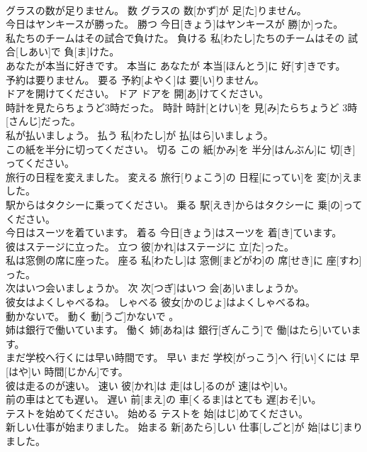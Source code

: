 \documentclass[8pt]{extreport}
\begin{document}
\begin{CJK}{UTF8}{min}
\\	グラスの数が足りません。	数	グラスの 数[かず]が 足[た]りません。	
\\	今日はヤンキースが勝った。	勝つ	今日[きょう]はヤンキースが 勝[か]った。	
\\	私たちのチームはその試合で負けた。	負ける	私[わたし]たちのチームはその 試合[しあい]で 負[ま]けた。	
\\	あなたが本当に好きです。	本当に	あなたが 本当[ほんとう]に 好[す]きです。	
\\	予約は要りません。	要る	予約[よやく]は 要[い]りません。	
\\	ドアを開けてください。	ドア	ドアを 開[あ]けてください。	
\\	時計を見たらちょうど3時だった。	時計	時計[とけい]を 見[み]たらちょうど 3時[さんじ]だった。	
\\	私が払いましょう。	払う	私[わたし]が 払[はら]いましょう。	
\\	この紙を半分に切ってください。	切る	この 紙[かみ]を 半分[はんぶん]に 切[き]ってください。	
\\	旅行の日程を変えました。	変える	旅行[りょこう]の 日程[にってい]を 変[か]えました。	
\\	駅からはタクシーに乗ってください。	乗る	駅[えき]からはタクシーに 乗[の]ってください。	
\\	今日はスーツを着ています。	着る	今日[きょう]はスーツを 着[き]ています。	
\\	彼はステージに立った。	立つ	彼[かれ]はステージに 立[た]った。	
\\	私は窓側の席に座った。	座る	私[わたし]は 窓側[まどがわ]の 席[せき]に 座[すわ]った。	
\\	次はいつ会いましょうか。	次	次[つぎ]はいつ 会[あ]いましょうか。	
\\	彼女はよくしゃべるね。	しゃべる	彼女[かのじょ]はよくしゃべるね。	
\\	動かないで。	動く	動[うご]かないで 。	
\\	姉は銀行で働いています。	働く	姉[あね]は 銀行[ぎんこう]で 働[はたら]いています。	
\\	まだ学校へ行くには早い時間です。	早い	まだ 学校[がっこう]へ 行[い]くには 早[はや]い 時間[じかん]です。	
\\	彼は走るのが速い。	速い	彼[かれ]は 走[はし]るのが 速[はや]い。	
\\	前の車はとても遅い。	遅い	前[まえ]の 車[くるま]はとても 遅[おそ]い。	
\\	テストを始めてください。	始める	テストを 始[はじ]めてください。	
\\	新しい仕事が始まりました。	始まる	新[あたら]しい 仕事[しごと]が 始[はじ]まりました。	

\end{CJK}
\end{document}
